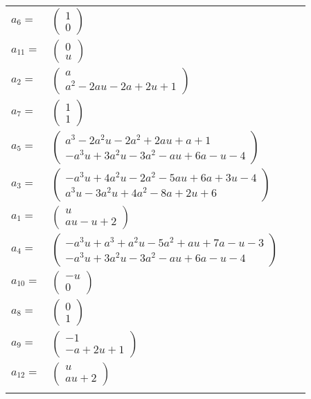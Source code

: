 \documentclass[1p]{elsarticle_modified}
\theoremstyle{definition}
\begin{document}
\begin{tabular}{m{7pt} m{180pt} m{7pt} m{180pt} }
\flushright $a_{6}=$&$\begin{pmatrix}1\\0\end{pmatrix}$ \\
\flushright $a_{11}=$&$\begin{pmatrix}0\\u\end{pmatrix}$ \\
\flushright $a_{2}=$&$\begin{pmatrix}a\\a^2-2 a u-2 a+2 u+1\end{pmatrix}$ \\
\flushright $a_{7}=$&$\begin{pmatrix}1\\1\end{pmatrix}$ \\
\flushright $a_{5}=$&$\begin{pmatrix}a^3-2 a^2 u-2 a^2+2 a u+a+1\\- a^3 u+3 a^2 u-3 a^2- a u+6 a- u-4\end{pmatrix}$ \\
\flushright $a_{3}=$&$\begin{pmatrix}- a^3 u+4 a^2 u-2 a^2-5 a u+6 a+3 u-4\\a^3 u-3 a^2 u+4 a^2-8 a+2 u+6\end{pmatrix}$ \\
\flushright $a_{1}=$&$\begin{pmatrix}u\\a u- u+2\end{pmatrix}$ \\
\flushright $a_{4}=$&$\begin{pmatrix}- a^3 u+a^3+a^2 u-5 a^2+a u+7 a- u-3\\- a^3 u+3 a^2 u-3 a^2- a u+6 a- u-4\end{pmatrix}$ \\
\flushright $a_{10}=$&$\begin{pmatrix}- u\\0\end{pmatrix}$ \\
\flushright $a_{8}=$&$\begin{pmatrix}0\\1\end{pmatrix}$ \\
\flushright $a_{9}=$&$\begin{pmatrix}-1\\- a+2 u+1\end{pmatrix}$ \\
\flushright $a_{12}=$&$\begin{pmatrix}u\\a u+2\end{pmatrix}$\\&\end{tabular}
\end{document}
